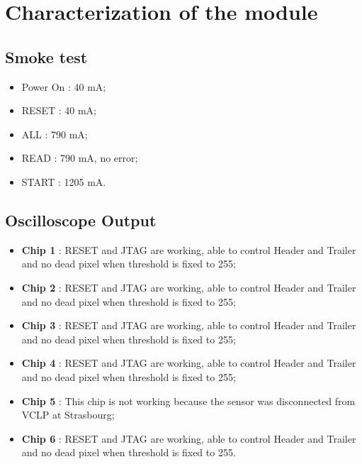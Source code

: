 \documentclass[a4papper, 11pt]{article}
\begin{document}


    \section{Characterization of the module}

      
      \subsection{Smoke test}
        
        \begin{itemize}
          \item Power On : 40 mA;
          \item RESET : 40 mA;
          \item ALL : 790 mA;
          \item READ : 790 mA, no error;
          \item START : 1205 mA.
        \end{itemize}

      
      \subsection{Oscilloscope Output}

        \begin{itemize}
            \item \textbf{Chip 1} : RESET and JTAG are working, able to control Header and Trailer and no dead pixel when threshold is fixed to 255;
            \item \textbf{Chip 2} : RESET and JTAG are working, able to control Header and Trailer and no dead pixel when threshold is fixed to 255;
            \item \textbf{Chip 3} : RESET and JTAG are working, able to control Header and Trailer and no dead pixel when threshold is fixed to 255;
            \item \textbf{Chip 4} : RESET and JTAG are working, able to control Header and Trailer and no dead pixel when threshold is fixed to 255;
            \item \textbf{Chip 5} : This chip is not working because the sensor was disconnected from VCLP at Strasbourg;
            \item \textbf{Chip 6} : RESET and JTAG are working, able to control Header and Trailer and no dead pixel when threshold is fixed to 255.
        \end{itemize}
      
\end{document}
